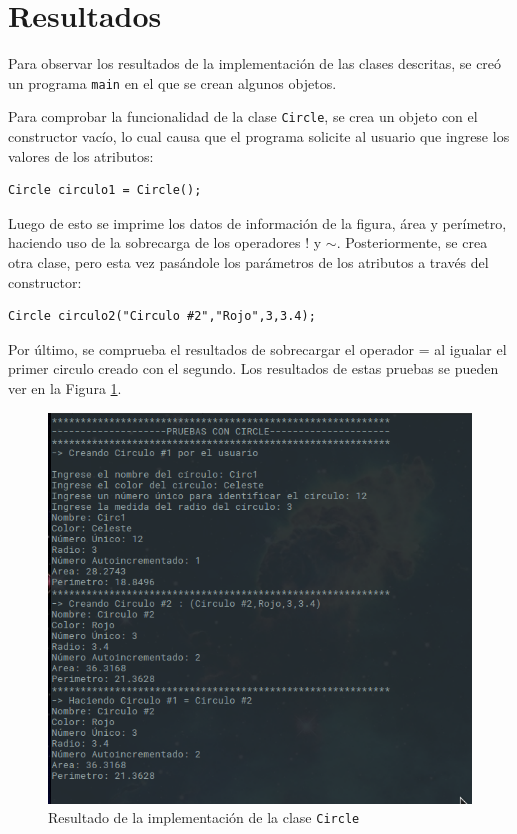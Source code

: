 \newpage
\section{Resultados}
Para observar los resultados de la implementación de las clases descritas, se creó un programa \texttt{main} en el que se crean algunos objetos. 

Para comprobar la funcionalidad de la clase \texttt{Circle}, se crea un objeto con el constructor vacío, lo cual causa que el programa solicite al usuario que ingrese los valores de los atributos:

\begin{verbatim}
Circle circulo1 = Circle();
\end{verbatim}

Luego de esto se imprime los datos de información de la figura, área y perímetro, haciendo uso de la sobrecarga de los operadores $!$ y $\sim$. Posteriormente, se crea otra clase, pero esta vez pasándole los parámetros de los atributos a través del constructor:

\begin{verbatim}
Circle circulo2("Circulo #2","Rojo",3,3.4);
\end{verbatim}

Por último, se comprueba el resultados de sobrecargar el operador = al igualar el primer circulo creado con el segundo. Los resultados de estas pruebas se pueden ver en la Figura \ref{fig:CIRC}.

\begin{figure}[H]
\centering
\includegraphics[width=.7\textwidth]{imgs/Labo3/CIRC}
\caption{Resultado de la implementación de la clase \texttt{Circle}}
\label{fig:CIRC}
\end{figure}

